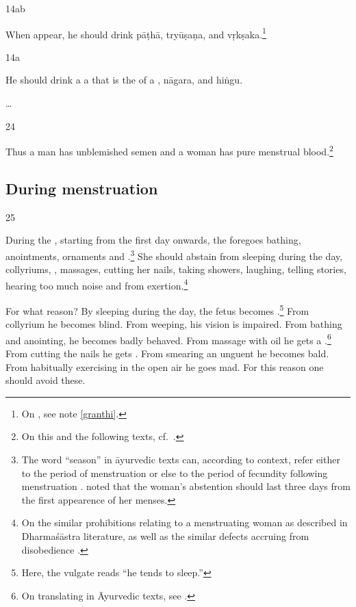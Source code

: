 \begin{translation}
\item[14ab]
 
 When  appear, he should drink \gls{pāṭhā}, 
 \gls{tryūṣaṇa}, and \gls{vṛkṣaka}.\footnote{On , see note 
 \ref{granthi}.}
 
 \item[14a] 
 
 He should drink a a  that is the
 of  a , \gls{nāgara},
and \gls{hiṅgu}.
 
\item[\ldots] 
 
\item[24]

Thus a man has unblemished semen and a woman has pure menstrual 
blood.\footnote{On this and the following texts, cf.\ \cite[389 et 
passim]{smet-2010}.}
 
 \subsection{During menstruation}
 
 \item[25]
 
During the , starting from the first day onwards, the
 foregoes bathing, anointments,
ornaments and .\footnote{The word 
    “season” in āyurvedic texts can, according to context, refer either to
    the period of menstruation or else to the period of fecundity
    following menstruation \citep[15\,ff., note 27, \emph{et
    passim}]{das-2003}.  noted that the woman's
    abstention should last three days from the first appearence of her
    menses.} She should abstain from sleeping during the day, collyriums,
    , massages, cutting her nails, taking
    showers, laughing, telling stories, hearing too much noise and from
    exertion.\footnote{On the similar prohibitions relating to a
        menstruating woman as described in Dharmaśāstra literature, as well as
        the similar defects accruing from disobedience         
        \citep[see][284--287]{lesl-1989}.}
        
For what reason?  By sleeping during the day, the fetus becomes
.\footnote{Here, the vulgate reads  “he
    tends to sleep.”} From collyrium he becomes blind.  From weeping, his
    vision is impaired. From bathing and anointing, he becomes badly
    behaved. From massage with oil he gets a .\footnote{On translating  in Āyurvedic texts, see
        \cite[96\,ff]{emme-1984}.} From cutting the nails he gets
        .  From smearing an unguent he becomes bald.
        From habitually exercising in the open air he goes mad. For this
        reason one should avoid these.
    

\end{translation}
